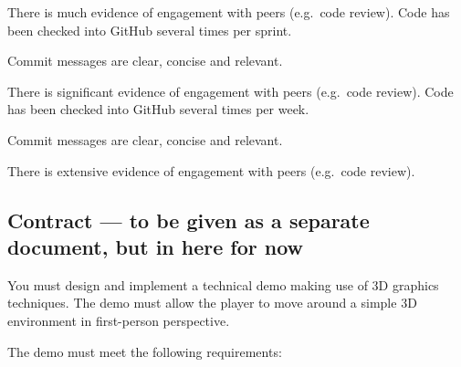\documentclass{../fal_assignment}
\begin{document}
\begin{markingrubric}
            \par There is much evidence of engagement with peers (e.g.\ code review).
        \grade Code has been checked into GitHub several times per sprint.
            \par Commit messages are clear, concise and relevant.
            \par There is significant evidence of engagement with peers (e.g.\ code review).
        \grade Code has been checked into GitHub several times per week.
            \par Commit messages are clear, concise and relevant.
            \par There is extensive evidence of engagement with peers (e.g.\ code review).
\end{markingrubric}

\subsection*{Contract --- to be given as a separate document, but in here for now}

You must design and implement a technical demo making use of 3D graphics techniques.
The demo must allow the player to move around a simple 3D environment in first-person perspective.

The demo must meet the following requirements:
\end{document}
